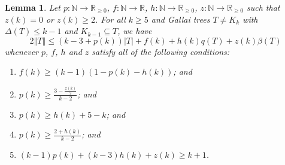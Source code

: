 \documentclass[10pt]{article}
\renewcommand{\ge}{\geqslant}
\renewcommand{\le}{\leqslant}
\theoremstyle{plain}
\newtheorem{lem}[thm]{Lemma}
\theoremstyle{definition}
\theoremstyle{remark}
\newcommand{\IN}{\mathbb{N}}
\newcommand{\IR}{\mathbb{R}}
\newcommand{\card}[1]{\left|#1\right|}
\newcommand{\size}[1]{\left\Vert#1\right\Vert}
\newcommand{\func}[3]{#1\colon #2 \rightarrow #3}
\begin{document}
\begin{lem}\label{bwkk1}
	Let $\func{p}{\IN}{\IR_{\ge 0}}$, $\func{f}{\IN}{\IR}$, $\func{h}{\IN}{\IR_{\ge 0}}$, $\func{z}{\IN}{\IR_{\ge 0}}$ such that $z(k) = 0$ or $z(k) \ge 2$.
	For all $k \ge 5$ and Gallai trees $T \ne K_k$ with $\Delta(T) \le k-1$ and $K_{k-1} \subseteq T$, we have
	\[2\size{T} \le (k-3 + p(k))\card{T} + f(k) + h(k)q(T) + z(k)\beta(T)\]
	whenever $p$, $f$, $h$ and $z$ satisfy all of the following conditions:
	\begin{enumerate}
		\item[(1)] $f(k) \ge (k-1)(1- p(k) - h(k))$; and	
	    \item[(2)] $p(k) \ge \frac{3 - \frac{z(k)}{2}}{k-2}$; and
		\item[(3)] $p(k) \ge h(k) + 5 - k$; and
		\item[(4)] $p(k) \ge \frac{2+h(k)}{k-2}$; and
		\item[(5)] $(k-1)p(k) + (k-3)h(k) + z(k)\ge k+1$.
	\end{enumerate}
\end{lem}
\end{document}
